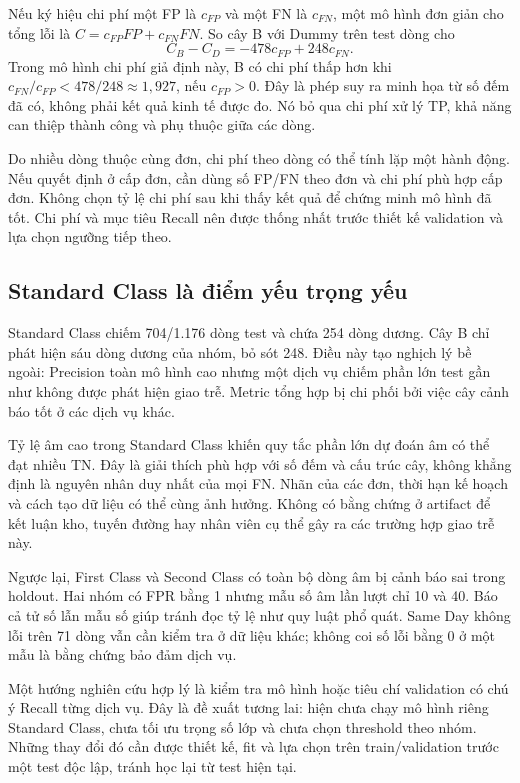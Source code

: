Nếu ký hiệu chi phí một FP là $c_{FP}$ và một FN là $c_{FN}$, một mô hình
đơn giản cho tổng lỗi là $C=c_{FP}FP+c_{FN}FN$. So cây B với Dummy trên
test dòng cho
\begin{equation}
C_{B}-C_{D}=-478c_{FP}+248c_{FN}.
\end{equation}
Trong mô hình chi phí giả định này, B có chi phí thấp hơn khi
$c_{FN}/c_{FP}<478/248\approx1{,}927$, nếu $c_{FP}>0$. Đây là phép suy
ra minh họa từ số đếm đã có, không phải kết quả kinh tế được đo. Nó bỏ qua
chi phí xử lý TP, khả năng can thiệp thành công và phụ thuộc giữa các dòng.

Do nhiều dòng thuộc cùng đơn, chi phí theo dòng có thể tính lặp một hành
động. Nếu quyết định ở cấp đơn, cần dùng số FP/FN theo đơn và chi phí phù
hợp cấp đơn. Không chọn tỷ lệ chi phí sau khi thấy kết quả để chứng minh
mô hình đã tốt. Chi phí và mục tiêu Recall nên được thống nhất trước
thiết kế validation và lựa chọn ngưỡng tiếp theo.

\subsection{Standard Class là điểm yếu trọng yếu}
Standard Class chiếm 704/1.176 dòng test và chứa 254 dòng dương. Cây B
chỉ phát hiện sáu dòng dương của nhóm, bỏ sót 248. Điều này tạo nghịch lý
bề ngoài: Precision toàn mô hình cao nhưng một dịch vụ chiếm phần lớn
test gần như không được phát hiện giao trễ. Metric tổng hợp bị chi phối
bởi việc cây cảnh báo tốt ở các dịch vụ khác.

Tỷ lệ âm cao trong Standard Class khiến quy tắc phần lớn dự đoán âm có
thể đạt nhiều TN. Đây là giải thích phù hợp với số đếm và cấu trúc cây,
không khẳng định là nguyên nhân duy nhất của mọi FN. Nhãn của các đơn,
thời hạn kế hoạch và cách tạo dữ liệu có thể cùng ảnh hưởng. Không có
bằng chứng ở artifact để kết luận kho, tuyến đường hay nhân viên cụ thể
gây ra các trường hợp giao trễ này.

Ngược lại, First Class và Second Class có toàn bộ dòng âm bị cảnh báo
sai trong holdout. Hai nhóm có FPR bằng 1 nhưng mẫu số âm lần lượt chỉ
10 và 40. Báo cả tử số lẫn mẫu số giúp tránh đọc tỷ lệ như quy luật phổ
quát. Same Day không lỗi trên 71 dòng vẫn cần kiểm tra ở dữ liệu khác;
không coi số lỗi bằng 0 ở một mẫu là bằng chứng bảo đảm dịch vụ.

Một hướng nghiên cứu hợp lý là kiểm tra mô hình hoặc tiêu chí validation
có chú ý Recall từng dịch vụ. Đây là đề xuất tương lai: hiện chưa chạy
mô hình riêng Standard Class, chưa tối ưu trọng số lớp và chưa chọn
threshold theo nhóm. Những thay đổi đó cần được thiết kế, fit và lựa chọn
trên train/validation trước một test độc lập, tránh học lại từ test hiện tại.

